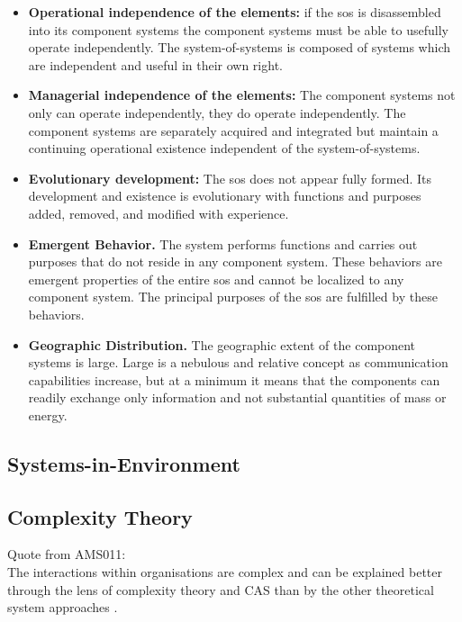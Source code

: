 \begin{itemize}
	\item{\textbf{Operational independence of the elements:} if the \acrshort{sos} is disassembled into its component systems the component systems must be able to usefully operate independently. The	system-of-systems is composed of systems which are independent and useful in their own right.}
	\item{\textbf{Managerial independence of the elements:} The component systems not only can operate independently, they do operate independently. The component systems are separately acquired and integrated but maintain a continuing operational existence independent of the system-of-systems.}
	\item{\textbf{Evolutionary development:} The \acrshort{sos} does not appear fully formed. Its development and existence is evolutionary with functions and purposes added, removed, and modified with experience.}
	\item{\textbf{Emergent Behavior.} The system performs functions and carries out purposes that do not reside in any component system. These behaviors are emergent properties of the entire \acrshort{sos} and cannot be localized to any component system. The principal purposes of the \acrshort{sos} are fulfilled by these behaviors.}
	\item{\textbf{Geographic Distribution.} The geographic extent of the component systems is large. Large is a nebulous and relative concept as communication capabilities increase, but at a minimum it means that the components can readily exchange only information and not substantial quantities of mass or energy.}
\end{itemize}

\subsection{Systems-in-Environment}

\parencite[p. 41]{Lapalme2012}

\subsection{Complexity Theory}
\label{sub:tbcomplexitytheory}
Quote from AMS011:\\
The interactions within organisations are complex and can be explained better through the lens of complexity theory and CAS than by the other theoretical system approaches \parencite[p. 15]{Turner2019}.\\

